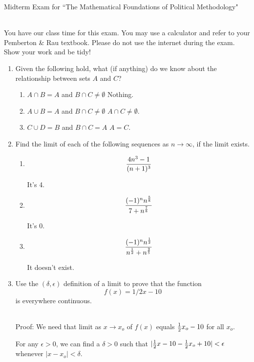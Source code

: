 \documentclass[11pt]{article}
\begin{document}
\noindent \large Midterm Exam for ``The Mathematical Foundations of Political Methodology"

\normalsize
\ \\You have our class time for this exam.  You may use a calculator and refer to your Pemberton \& Rau textbook.  Please do not use the internet during the exam.  Show your work and be tidy!

\begin{enumerate}

\item Given the following hold, what (if anything) do we know about the relationship between sets $A$ and $C$?

\begin{enumerate}
\item $A\cap B= A$ and $B\cap C\not=\emptyset$
 Nothing.
\item $A\cup B= A$ and $B\cap C\not=\emptyset$
$A\cap C\not=\emptyset$.
\item $C \cup D=B$ and $B\cap C=A$
 $A = C$.

\end{enumerate}

\vspace{.2in}

\item Find the limit of each of the following sequences as $n\rightarrow \infty$, if the limit exists.
\begin{enumerate}
\item $${{4n^3-1}\over{(n+1)^3}}$$

It's 4.
\item $${{(-1)^n n^{5\over 8}}\over{7+n^{7\over 8}}}$$

 It's 0.
 
\item $${{(-1)^n n^{1\over 2}}\over{n^{1\over 2}+n^{2\over 5}}}$$

 It doesn't exist.
\end{enumerate}

\vspace{.2in}

\item Use the $(\delta, \epsilon)$ definition of a limit to prove that the function $$f(x)={1/2}x-10$$ is everywhere continuous.

\ \\Proof: We need that limit as $x\rightarrow x_o$ of $f(x)$ equals ${1\over 2}x_o-10$ for all $x_o$.  

For any $\epsilon>0$, we can find a $\delta>0$ such that $|{1\over 2}x-10-{1\over 2}x_o+10|<\epsilon$ whenever $|x-x_o|<\delta$.  


\end{enumerate}
\end{document}
